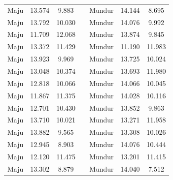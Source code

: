 \begin{longtable}{|c|c|c|c|c|c|c|}
  Maju           & 13.574              & 9.883            &  & Mundur         & 14.144              & 8.695            \\ \cline{1-3} \cline{5-7} 
  Maju           & 13.792              & 10.030           &  & Mundur         & 14.076              & 9.992            \\ \cline{1-3} \cline{5-7} 
  Maju           & 11.709              & 12.068           &  & Mundur         & 13.874              & 9.845            \\ \cline{1-3} \cline{5-7} 
  Maju           & 13.372              & 11.429           &  & Mundur         & 11.190              & 11.983           \\ \cline{1-3} \cline{5-7} 
  Maju           & 13.923              & 9.969            &  & Mundur         & 13.725              & 10.024           \\ \cline{1-3} \cline{5-7} 
  Maju           & 13.048              & 10.374           &  & Mundur         & 13.693              & 11.980           \\ \cline{1-3} \cline{5-7} 
  Maju           & 12.818              & 10.066           &  & Mundur         & 14.066              & 10.045           \\ \cline{1-3} \cline{5-7} 
  Maju           & 11.867              & 11.375           &  & Mundur         & 14.028              & 10.116           \\ \cline{1-3} \cline{5-7} 
  Maju           & 12.701              & 10.430           &  & Mundur         & 13.852              & 9.863            \\ \cline{1-3} \cline{5-7} 
  Maju           & 13.710              & 10.021           &  & Mundur         & 13.271              & 11.958           \\ \cline{1-3} \cline{5-7} 
  Maju           & 13.882              & 9.565            &  & Mundur         & 13.308              & 10.026           \\ \cline{1-3} \cline{5-7} 
  Maju           & 12.945              & 8.903            &  & Mundur         & 14.076              & 10.444           \\ \cline{1-3} \cline{5-7} 
  Maju           & 12.120              & 11.475           &  & Mundur         & 13.201              & 11.415           \\ \cline{1-3} \cline{5-7} 
  Maju           & 13.302              & 8.879            &  & Mundur         & 14.040              & 7.512            \\ \cline{1-3} \cline{5-7} 

\end{longtable}
